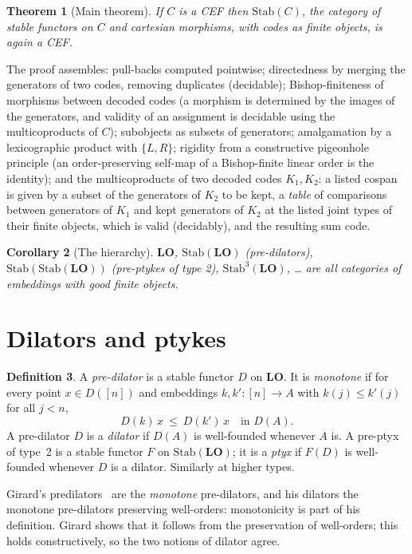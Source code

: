 \documentclass[11pt]{article}
\newtheorem{theorem}{Theorem}[section]
\newtheorem{corollary}[theorem]{Corollary}
\theoremstyle{definition}
\newtheorem{definition}[theorem]{Definition}
\theoremstyle{remark}
\newcommand{\Stab}{\mathrm{Stab}}
\newcommand{\LO}{\mathbf{LO}}
\begin{document}
\begin{theorem}[Main theorem]
If $C$ is a CEF then $\Stab(C)$, the category of stable functors on $C$
and cartesian morphisms, with codes as finite objects, is again a CEF.
\end{theorem}

The proof assembles: pull-backs computed pointwise; directedness by
merging the generators of two codes, removing duplicates (decidable);
Bishop-finiteness of morphisms between decoded codes (a morphism is
determined by the images of the generators, and validity of an assignment is
decidable using the multicoproducts of $C$); subobjects as subsets of
generators; amalgamation by a lexicographic product with $\{L,R\}$;
rigidity from a constructive pigeonhole principle (an order-preserving
self-map of a Bishop-finite linear order is the identity); and the
multicoproducts of two decoded codes $K_1,K_2$: a listed cospan is given by
a subset of the generators of $K_2$ to be kept, a \emph{table} of
comparisons between generators of $K_1$ and kept generators of $K_2$ at the
listed joint types of their finite objects, which is valid (decidably), and
the resulting sum code.

\begin{corollary}[The hierarchy]
$\LO$, $\Stab(\LO)$ (pre-dilators), $\Stab(\Stab(\LO))$ (pre-ptykes of
type 2), $\Stab^3(\LO)$, \dots{} are all categories of embeddings with good
finite objects.
\end{corollary}

\section{Dilators and ptykes}

\begin{definition}\label{def:dil}
A \emph{pre-dilator} is a stable functor $D$ on $\LO$. It is
\emph{monotone} if for every point $x\in D([n])$ and embeddings
$k,k':[n]\to A$ with $k(j)\le k'(j)$ for all $j<n$,
\[ D(k)\,x\ \le\ D(k')\,x \quad\text{in } D(A). \]
A pre-dilator $D$ is a \emph{dilator} if $D(A)$ is well-founded whenever
$A$ is. A pre-ptyx of type~2 is a stable functor $F$ on $\Stab(\LO)$; it is
a \emph{ptyx} if $F(D)$ is well-founded whenever $D$ is a dilator. Similarly
at higher types.
\end{definition}

Girard's predilators~\cite{Gir81,GirPTLC,GN} are the \emph{monotone}
pre-dilators, and his dilators the monotone pre-dilators preserving
well-orders: monotonicity is part of his definition. Girard shows that it
follows from the preservation of well-orders; this holds constructively, so
the two notions of dilator agree.
\end{document}

